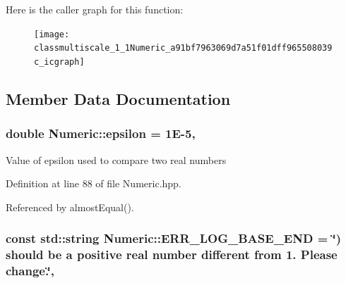 Here is the caller graph for this function\-:\nopagebreak
\begin{figure}[H]
\begin{center}
\leavevmode
\texttt{[image: classmultiscale\_1\_1Numeric\_a91bf7963069d7a51f01dff965508039c\_icgraph]}
\end{center}
\end{figure}




\subsection{Member Data Documentation}
\hypertarget{classmultiscale_1_1Numeric_ac66cc2092ff149af068ac93aa3a6cc51}{
\subsubsection[{epsilon}]{\setlength{\rightskip}{0pt plus 5cm}double Numeric\-::epsilon = 1\-E-\/5\hspace{0.3cm}{\ttfamily [static]}, {\ttfamily [private]}}}\label{classmultiscale_1_1Numeric_ac66cc2092ff149af068ac93aa3a6cc51}
Value of epsilon used to compare two real numbers 

Definition at line 88 of file Numeric.\-hpp.



Referenced by almost\-Equal().

\hypertarget{classmultiscale_1_1Numeric_a291c98ea0c6e6c4042fe9ecc4af0443a}{
\subsubsection[{E\-R\-R\-\_\-\-L\-O\-G\-\_\-\-B\-A\-S\-E\-\_\-\-E\-N\-D}]{\setlength{\rightskip}{0pt plus 5cm}const std\-::string Numeric\-::\-E\-R\-R\-\_\-\-L\-O\-G\-\_\-\-B\-A\-S\-E\-\_\-\-E\-N\-D = \char`\"{}) should be a positive real number different from 1. Please change.\char`\"{}\hspace{0.3cm}{\ttfamily [static]}, {\ttfamily [private]}}}\label{classmultiscale_1_1Numeric_a291c98ea0c6e6c4042fe9ecc4af0443a}


